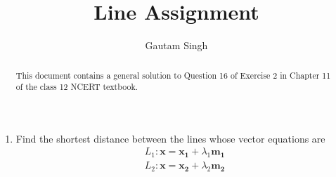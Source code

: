\documentclass[journal,12pt,twocolumn]{IEEEtran}
\renewcommand{\vec}[1]{\boldsymbol{\mathbf{#1}}}
\begin{document}
\vspace{3cm}
\title{Line Assignment}
\author{Gautam Singh}
\maketitle
\bigskip

\begin{abstract}
    This document contains a general solution to Question 16 of 
    Exercise 2 in Chapter 11 of the class 12 NCERT textbook.
\end{abstract}

\begin{enumerate}
    \item Find the shortest distance between the lines whose vector equations are
    \begin{align}
        L_1: \vec{x} = \vec{x_1} + \lambda_1\vec{m_1} \label{eq:L1} \\
        L_2: \vec{x} = \vec{x_2} + \lambda_2\vec{m_2} \label{eq:L2}
    \end{align}


\end{enumerate}
\end{document}

